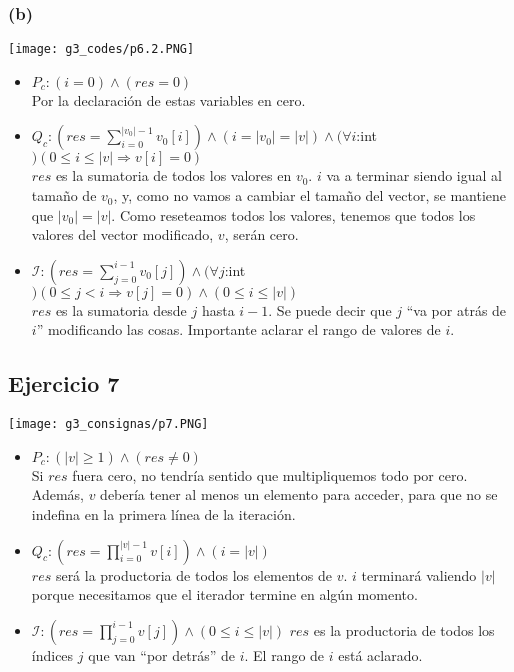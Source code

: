 \documentclass[12 pt]{article}
\begin{document}
    \subsubsection*{(b)}
        \begin{center}
            \texttt{[image: g3\_codes/p6.2.PNG]}
        \end{center}
        \begin{itemize}
            \item $P_{c}: (i = 0) \wedge (res = 0)$
            \\
                Por la declaración de estas variables en cero.
            \item $Q_{c}: \left(res = \sum^{|v_{0}|-1}_{i=0}v_{0}[i]\right) \wedge (i = |v_{0}| = |v|) \wedge (\forall i$:int$)(0 \leq i \leq |v| \Rightarrow v[i] = 0)$
            \\
                $res$ es la sumatoria de todos los valores en $v_{0}$. $i$ va a terminar siendo igual al tamaño de $v_{0}$, y, como no vamos a cambiar el tamaño del vector, se mantiene que $|v_{0}| = |v|$. Como reseteamos todos los valores, tenemos que todos los valores del vector modificado, $v$, serán cero.
            \item $\mathcal{I}: \left(res = \sum^{i-1}_{j=0}v_{0}[j]\right) \wedge (\forall j$:int$)(0 \leq j < i \Rightarrow v[j] = 0) \wedge (0 \leq i \leq |v|)$
            \\
                $res$ es la sumatoria desde $j$ hasta $i-1$. Se puede decir que $j$ ``va por atrás de $i$'' modificando las cosas. Importante aclarar el rango de valores de $i$.
        \end{itemize}

\subsection*{Ejercicio 7}
    \begin{center}
        \texttt{[image: g3\_consignas/p7.PNG]}
    \end{center}
    \begin{itemize}
        \item $P_{c}: (|v| \geq 1) \wedge (res \neq 0)$
        \\
            Si $res$ fuera cero, no tendría sentido que multipliquemos todo por cero. Además, $v$ debería tener al menos un elemento para acceder, para que no se indefina en la primera línea de la iteración.
        \item $Q_{c}: \left(res = \prod^{|v|-1}_{i=0}v[i]\right) \wedge (i = |v|)$
        \\
            $res$ será la productoria de todos los elementos de $v$. $i$ terminará valiendo $|v|$ porque necesitamos que el iterador termine en algún momento.
        \item $\mathcal{I}: \left(res = \prod^{i-1}_{j=0}v[j]\right) \wedge (0 \leq i \leq |v|)$
            $res$ es la productoria de todos los índices $j$ que van ``por detrás'' de $i$. El rango de $i$ está aclarado.
    \end{itemize}
\end{document}
